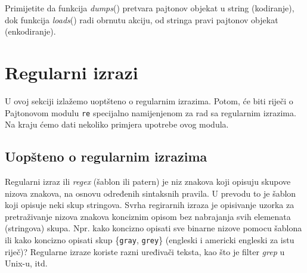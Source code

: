 Primijetite da funkcija \textit{dumps}() pretvara pajtonov objekat u string (kodiranje), dok funkcija \textit{loads}() radi obrnutu akciju, od stringa pravi pajtonov objekat (enkodiranje). 

\section{Regularni izrazi}

U ovoj sekciji izlažemo uoptšteno o regularnim izrazima. Potom, će biti riječi o Pajtonovom modulu \texttt{re} specijalno namijenjenom za rad sa regularnim izrazima. Na kraju ćemo dati nekoliko primjera upotrebe ovog modula. 

\subsection{Uopšteno o regularnim izrazima}

Regularni izraz ili \textit{regex} (šablon ili patern) je niz znakova koji opisuju skupove nizova znakova, na osnovu određenih sintaksnih pravila. U prevodu to je šablon koji opisuje neki skup stringova.  Svrha regirarnih izraza je opisivanje uzorka za pretraživanje nizova znakova konciznim opisom bez nabrajanja svih elemenata (stringova) skupa. Npr. kako koncizno opisati sve binarne nizove
pomocu šablona ili kako koncizno opisati skup \{\texttt{gray}, \texttt{grey}\} (engleski i
americki engleski za istu riječ)? Regularne izraze koriste razni uređivači teksta, kao što je filter \textit{grep} u Unix-u, itd. 

